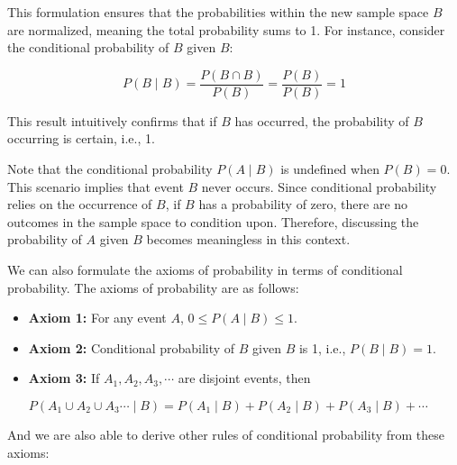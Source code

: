 This formulation ensures that the probabilities within the new sample space \( B \) are normalized, meaning the total probability sums to 1. For instance, consider the conditional probability of \( B \) given \( B \):

\[
P(B \mid B) = \frac{P(B \cap B)}{P(B)} = \frac{P(B)}{P(B)} = 1
\]

This result intuitively confirms that if \( B \) has occurred, the probability of \( B \) occurring is certain, i.e., 1.

Note that the conditional probability \( P(A \mid B) \) is undefined when \( P(B) = 0 \). This scenario implies that event \( B \) never occurs. Since conditional probability relies on the occurrence of \( B \), if \( B \) has a probability of zero, there are no outcomes in the sample space to condition upon. Therefore, discussing the probability of \( A \) given \( B \) becomes meaningless in this context.

We can also formulate the axioms of probability in terms of conditional probability. The axioms of probability are as follows:

\begin{axiom}
    \begin{itemize}
        \item \textbf{Axiom 1:} For any event \(A\), \( 0 \leq P(A\mid B) \leq 1 \).
        \item \textbf{Axiom 2:} Conditional probability of $B$ given $B$ is 1, i.e., $P(B \mid B)=1$.
        \item \textbf{Axiom 3:} If \(A_1, A_2, A_3, \cdots\) are disjoint events, then
         
        \hspace*{2.8em}$P\left(A_1 \cup A_2 \cup A_3 \cdots \mid B\right)=P\left(A_1 \mid B\right)+P\left(A_2 \mid B\right)+P\left(A_3 \mid B\right)+\cdots$
    \end{itemize}
\end{axiom}

And we are also able to derive other rules of conditional probability from these axioms:


